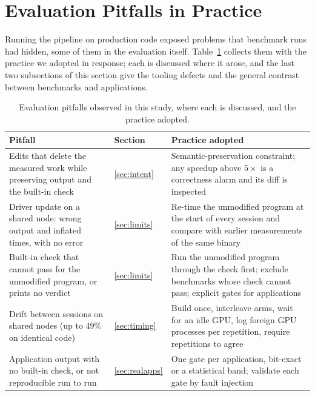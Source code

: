 \section{Evaluation Pitfalls in Practice}
\label{sec:pitfalls}
Running the pipeline on production code exposed problems that benchmark runs had hidden, some of
them in the evaluation itself. Table~\ref{tab:pitfalls} collects them with the practice we adopted
in response; each is discussed where it arose, and the last two subsections of this section give
the tooling defects and the general contrast between benchmarks and applications.

\begin{table}[t]
\centering
\footnotesize
\caption{Evaluation pitfalls observed in this study, where each is discussed, and the practice adopted.}
\label{tab:pitfalls}
\begin{tabular}{@{}p{}p{}p{}@{}}
\toprule
\textbf{Pitfall} & \textbf{Section} & \textbf{Practice adopted} \\
\midrule
Edits that delete the measured work while preserving output and the built-in check
  & \ref{sec:intent} & Semantic-preservation constraint; any speedup above $5\times$ is a correctness alarm and its diff is inspected \\
Driver update on a shared node: wrong output and inflated times, with no error
  & \ref{sec:limits} & Re-time the unmodified program at the start of every session and compare with earlier measurements of the same binary \\
Built-in check that cannot pass for the unmodified program, or prints no verdict
  & \ref{sec:limits} & Run the unmodified program through the check first; exclude benchmarks whose check cannot pass; explicit gates for applications \\
Drift between sessions on shared nodes (up to $49\%$ on identical code)
  & \ref{sec:timing} & Build once, interleave arms, wait for an idle GPU, log foreign GPU processes per repetition, require repetitions to agree \\
Application output with no built-in check, or not reproducible run to run
  & \ref{sec:realapps} & One gate per application, bit-exact or a statistical band; validate each gate by fault injection \\

\end{tabular}
\end{table}
